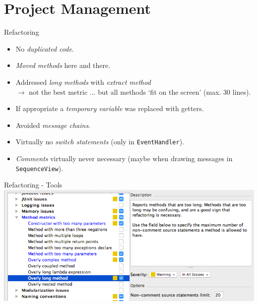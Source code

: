 \documentclass[10pt]{beamer}
\begin{document}
\section{Project Management}


\begin{frame}[fragile]{Refactoring}
\begin{itemize}
\item No \textit{duplicated code}.
\item \textit{Moved methods} here and there.
\item Addressed \textit{long methods} with \textit{extract method} \\
$\rightarrow$ not the best metric ... but all methods `fit on the screen' (max. 30 lines).
\item If appropriate a \textit{temporary variable} was replaced with getters.
\item Avoided \textit{message chains}.
\item Virtually no \textit{switch statements} (only in \texttt{EventHandler}).
\item \textit{Comments} virtually never necessary (maybe when drawing messages in \texttt{SequenceView}).
\end{itemize}
\end{frame}

\begin{frame}[fragile]{Refactoring - Tools}
	\includegraphics[width=1\textwidth]{refactoring}
\end{frame}
\end{document}
